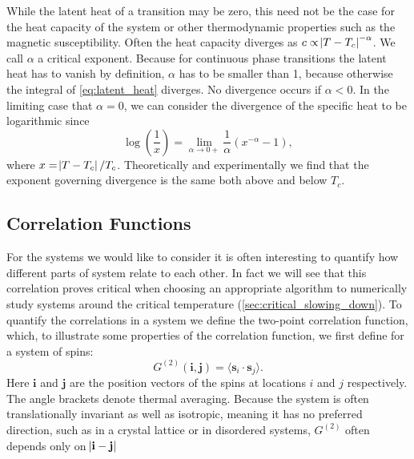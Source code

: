 \documentclass[11pt, a4paper]{report} %
\begin{document}
While the latent heat of a transition may be zero, this need not be the case for the heat capacity of the system or other thermodynamic properties such as the magnetic susceptibility.
Often the heat capacity diverges as \(c \propto \abs{T-T_c}^{-\alpha}\).
We call \(\alpha\) a critical exponent.
Because for continuous phase transitions the latent heat has to vanish by definition, \(\alpha\) has to be smaller than 1, because otherwise the integral of \cref{eq:latent_heat} diverges.
No divergence occurs if \(\alpha < 0\).
In the limiting case that \(\alpha = 0\), we can consider the divergence of the specific heat to be logarithmic since
\begin{equation}
	\log(\frac{1}{x}) = \lim_{\alpha \to 0+} \frac{1}{\alpha}\left(x^{-\alpha} - 1\right),
\end{equation}
where \(x = \abs{T - T_c}/T_c\).
Theoretically and experimentally we find that the exponent governing divergence is the same both above and below \(T_c\).\cite{binney:1992}

\subsection{Correlation Functions}
For the systems we would like to consider it is often interesting to quantify how different parts of system relate to each other.
In fact we will see that this correlation proves critical when choosing an appropriate algorithm to numerically study systems around the critical temperature (\cref{sec:critical_slowing_down}).
To quantify the correlations in a system we define the two-point correlation function\cite{binney:1992}, which, to illustrate some properties of the correlation function, we first define for a system of spins:
\begin{equation}
	G^{(2)}(\mathbf{i}, \mathbf{j}) = \langle{\mathbf{s}_i \cdot \mathbf{s}_j}\rangle.
\end{equation}
Here \(\mathbf{i}\) and \(\mathbf{j}\) are the position vectors of the spins at locations \(i\) and \(j\) respectively.
The angle brackets denote thermal averaging.
Because the system is often translationally invariant as well as isotropic, meaning it has no preferred direction, such as in a crystal lattice or in disordered systems, \(G^{(2)}\) often depends only on \(\abs{\mathbf{i} - \mathbf{j}} \)
\end{document}

